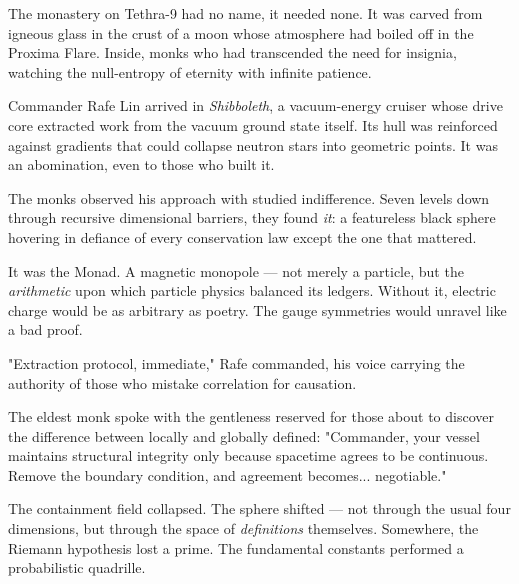 \begin{tcolorbox}[colback=gray!5,colframe=gray!40,boxrule=0.5pt,arc=3pt,boxsep=10pt,left=8pt,right=8pt,top=8pt,bottom=8pt]

The monastery on Tethra-9 had no name, it needed none. It was carved from igneous glass in the crust of a moon whose atmosphere had boiled off in the Proxima Flare. Inside, monks who had transcended the need for insignia, watching the null-entropy of eternity with infinite patience.

\medskip

Commander Rafe Lin arrived in \emph{Shibboleth}, a vacuum-energy cruiser whose drive core extracted work from the vacuum ground state itself. Its hull was reinforced against gradients that could collapse neutron stars into geometric points. It was an abomination, even to those who built it.

\medskip

The monks observed his approach with studied indifference. Seven levels down through recursive dimensional barriers, they found \emph{it}: a featureless black sphere hovering in defiance of every conservation law except the one that mattered.

\medskip

It was the Monad. A magnetic monopole — not merely a particle, but the \emph{arithmetic} upon which particle physics balanced its ledgers. Without it, electric charge would be as arbitrary as poetry. The gauge symmetries would unravel like a bad proof.

\medskip

"Extraction protocol, immediate," Rafe commanded, his voice carrying the authority of those who mistake correlation for causation.

\medskip

The eldest monk spoke with the gentleness reserved for those about to discover the difference between locally and globally defined: "Commander, your vessel maintains structural integrity only because spacetime agrees to be continuous. Remove the boundary condition, and agreement becomes... negotiable."

\medskip

The containment field collapsed. The sphere shifted — not through the usual four dimensions, but through the space of \emph{definitions} themselves. Somewhere, the Riemann hypothesis lost a prime. The fundamental constants performed a probabilistic quadrille.

\medskip


\end{tcolorbox}
